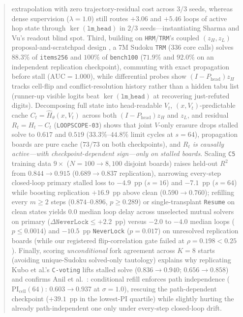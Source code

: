 \documentclass[10pt,letterpaper]{article}
\newcommand{\Phead}{P_{\mathrm{head}}}
\begin{document}
\begin{abstract}
extrapolation with zero trajectory-residual cost across $3/3$ seeds, whereas dense supervision ($\lambda=1.0$) still routes $+3.06$ and $+5.46$ loops of active hop state through $\ker(\texttt{lm\_head})$ in $2/3$ seeds—instantiating Sharma and Vu's \cite{sharma2026dense} readout blind spot. Third, building on \texttt{HRM}/\texttt{TRM}'s coupled $(z_H, z_L)$ proposal-and-scratchpad design \cite{wang2025hrm,jolicoeur2025trm}, a 7M Sudoku \texttt{TRM} (336 core calls) solves $88.3\%$ of \texttt{items256} and $100\%$ of \texttt{bench100} ($71.9\%$ and $92.0\%$ on an independent replication checkpoint), commuting with exact propagation before stall ($\mathrm{AUC}=1.000$), while differential probes show $(I-\Phead)z_H$ tracks cell-flip and conflict-resolution history rather than a hidden tabu list (runner-up visible logits beat $\ker(\texttt{lm\_head})$ at recovering just-refuted digits). Decomposing full state into head-readable $V_t$, $(x,V_t)$-predictable cache $C_t = \hat{H}_\theta(x,V_t)$ across both $(I-\Phead)z_H$ and $z_L$, and residual $R_t = H_t - C_t$ (\texttt{LOOPSCOPE-03}) shows that joint $V$-only erasure drops stalled solve to $0.617$ and $0.519$ ($33.3\%$--$44.8\%$ limit cycles at $s=64$), propagation boards are pure cache ($73/73$ on both checkpoints), and \emph{$R_t$ is causally active—with checkpoint-dependent sign—only on stalled boards}. Scaling \texttt{C5} training data $9\times$ ($N=100 \to 8{,}100$ disjoint boards) raises held-out $R^2$ from $0.844 \to 0.915$ ($0.689 \to 0.837$ replication), narrowing every-step closed-loop primary stalled loss to $-4.9$~pp ($s=16$) and $-7.1$~pp ($s=64$) while boosting replication $+16.9$~pp above clean ($0.590 \to 0.760$); refilling every $m \ge 2$ steps ($0.874$--$0.896$, $p \ge 0.289$) or single-transplant \texttt{Resume} on clean states yields $0.0$ median loop delay across unselected mutual solvers on primary ($\Delta\texttt{NeverLock} \le +2.2$~pp) versus $-2.0$ to $-4.0$ median loops ($p \le 0.0014$) and $-10.5$~pp \texttt{NeverLock} ($p=0.017$) on unresolved replication boards (while our registered flip-correlation gate failed at $\rho=0.198 < 0.25$). Finally, scoring \emph{unconditional} fork agreement across $K=8$ starts (avoiding unique-Sudoku solved-only tautology) explains why replicating Kubo et al.'s \cite{kubo2026cvoting} \texttt{C-voting} lifts stalled solve ($0.836 \to 0.940$; $0.656 \to 0.858$) and confirms Anil et al.\ \cite{anil2022path}: conditional refill enforces path independence ($\mathrm{PI}_{\mathrm{cell}}(64)$: $0.603 \to 0.937$ at $\sigma=1.0$), rescuing the path-dependent checkpoint ($+39.1$~pp in the lowest-PI quartile) while slightly hurting the already path-independent one only under every-step closed-loop drift.
\end{abstract}
\end{document}
